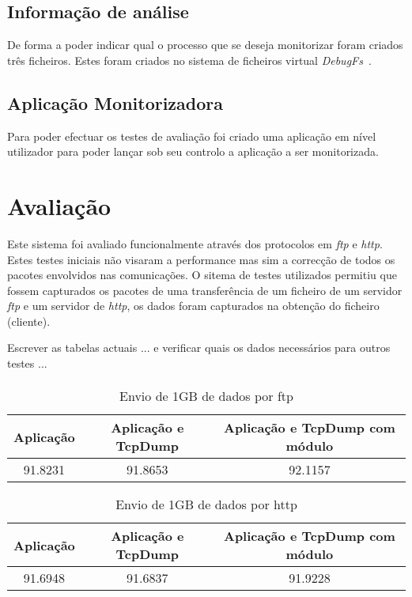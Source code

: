 \documentclass[a4paper]{llncs}
\begin{document}
\subsection*{Informação de análise}
\label{sub:data_information}

De forma a poder indicar qual o processo que se deseja monitorizar foram criados três ficheiros. Estes foram criados no sistema de ficheiros virtual \textit{DebugFs}~\cite{DebugFs}.

\subsection{Aplicação Monitorizadora}
\label{sub:monitor_app}
Para poder efectuar os testes de avaliação foi criado uma aplicação em nível utilizador para poder lançar sob seu controlo a aplicação a ser monitorizada.

\section{Avaliação}
\label{sec:evaluation}
Este sistema foi avaliado funcionalmente através dos protocolos em \textit{ftp} e \textit{http}. Estes testes iniciais não visaram a performance mas sim a correcção de todos os pacotes envolvidos nas comunicações.
O sitema de testes utilizados permitiu que fossem capturados os pacotes de uma transferência de um ficheiro de um servidor \textit{ftp} e um servidor de \textit{http}, os dados foram capturados na obtenção do ficheiro (cliente).

Escrever as tabelas actuais ... e verificar quais os dados necessários para outros testes ...
\paragraph*{}

\begin{table}
\caption{Envio de 1GB de dados por ftp}
\begin{tabular}{| c | c | c |}
\hline
\hspace {1cm} Aplicação \hspace {1cm} & Aplicação e TcpDump & Aplicação e TcpDump com módulo \\
\hline
91.8231 & 91.8653 & 92.1157 \\
\hline
\end{tabular}
\end{table}

\begin{center}
\begin{table}
\caption{Envio de 1GB de dados por http}
\begin{tabular}{ | c | c | c  | }
\hline
\hspace {1cm} Aplicação \hspace {1cm} & Aplicação e TcpDump & Aplicação e TcpDump com módulo \\
\hline
91.6948 & 91.6837 & 91.9228 \\
\hline
\end{tabular}
\end{table}
\end{center}
\end{document}
